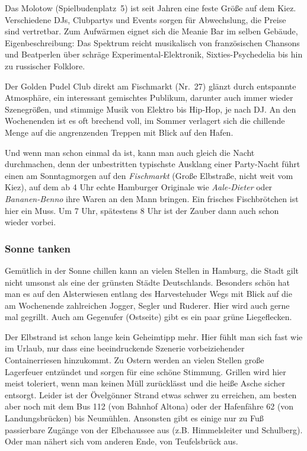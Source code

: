 Das Molotow (Spielbudenplatz~5) ist seit Jahren eine feste Größe auf dem Kiez.
Verschiedene DJs, Clubpartys und Events sorgen für Abwechslung, die Preise sind
vertretbar. Zum Aufwärmen eignet sich die Meanie Bar im selben Gebäude,
Eigenbeschreibung: \glqq Das Spektrum reicht musikalisch von französischen
Chansons und Beatperlen über schräge Experimental-Elektronik,
Sixties-Psychedelia bis hin zu russischer Folklore.\grqq

Der Golden Pudel Club direkt am Fischmarkt (Nr.~27) glänzt durch entspannte
Atmosphäre, ein interessant gemischtes Publikum, darunter auch immer wieder
Szenegrößen, und stimmige Musik von Elektro bis Hip-Hop, je nach DJ. An den
Wochenenden ist es oft brechend voll, im Sommer verlagert sich die chillende
Menge auf die angrenzenden Treppen mit Blick auf den Hafen.

Und wenn man schon einmal da ist, kann man auch gleich die Nacht durchmachen,
denn der unbestritten typischste Ausklang einer Party-Nacht führt einen am
Sonntagmorgen auf den \emph{Fischmarkt} (Große Elbstraße, nicht weit vom Kiez),
auf dem ab 4 Uhr echte Hamburger Originale wie \emph{Aale-Dieter} oder
\emph{Bananen-Benno} ihre Waren an den Mann bringen. Ein frisches Fischbrötchen
ist hier ein Muss. Um 7 Uhr, spätestens 8 Uhr ist der Zauber dann auch schon
wieder vorbei.

\subsubsection{Sonne tanken}

Gemütlich in der Sonne chillen kann an vielen Stellen in Hamburg, die Stadt
gilt nicht umsonst als eine der grünsten Städte Deutschlands. Besonders schön
hat man es auf den Alsterwiesen entlang des Harvestehuder Wegs mit Blick auf
die am Wochenende zahlreichen Jogger, Segler und Ruderer. Hier wird auch gerne
mal gegrillt. Auch am Gegenufer (Ostseite) gibt es ein paar grüne
Liegeflecken.

Der Elbstrand ist schon lange kein Geheimtipp mehr. Hier fühlt man sich fast
wie im Urlaub, nur dass eine beeindruckende Szenerie vorbeiziehender
Containerriesen hinzukommt. Zu Ostern werden an vielen Stellen große Lagerfeuer
entzündet und sorgen für eine schöne Stimmung. Grillen wird hier meist
toleriert, wenn man keinen Müll zurücklässt und die heiße Asche sicher
entsorgt. Leider ist der Övelgönner Strand etwas schwer zu erreichen, am besten
aber noch mit dem Bus 112 (von Bahnhof Altona) oder der Hafenfähre 62 (von
Landungsbrücken) bis Neumühlen. Ansonsten gibt es einige nur zu Fuß passierbare
Zugänge von der Elbchaussee aus (z.B. Himmelsleiter und Schulberg). Oder man
nähert sich vom anderen Ende, von Teufelsbrück aus.


